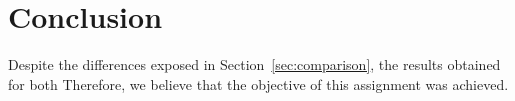 \section{Conclusion}
\label{sec:conclusion}


Despite the differences exposed in Section~\ref{sec:comparison}, the results obtained for both 
Therefore, we believe that the objective of this assignment was achieved.


